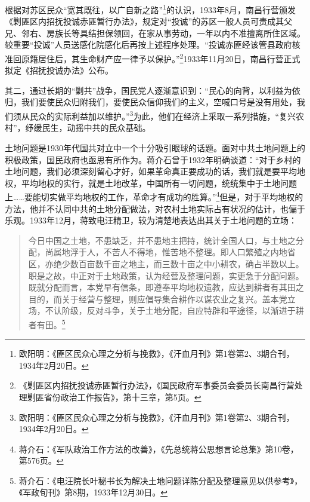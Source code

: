 根据对苏区民众“宽其既往，以广自新之路”\footnote{欧阳明：《匪区民众心理之分析与挽救》，《汗血月刊》第1卷第2、3期合刊，1934年2月20日。}的认识，1933年8月，南昌行营颁发《剿匪区内招抚投诚赤匪暂行办法》，规定对“投诚”的苏区一般人员可责成其父兄、邻右、房族长等具结担保领回，在家从事劳动，一年以内不准擅离所住区域。较重要“投诚”人员送感化院感化后再按上述程序处理。“投诚赤匪经该管县政府核准回原籍居住后，其生命财产应一律予以保护。”\footnote{《剿匪区内招抚投诚赤匪暂行办法》，《国民政府军事委员会委员长南昌行营处理剿匪省份政治工作报告》，第十三章，第5页。}1933年11月20日，南昌行营正式拟定《招抚投诚办法》公布。


其二，通过长期的“剿共”战争，国民党人逐渐意识到：“民心的向背，以利益为依归，我们要使民众归附我们，要使民众信仰我们的主义，空喊口号是没有用处，我们须从民众的实际利益加以维护。”\footnote{欧阳明：《匪区民众心理之分析与挽救》，《汗血月刊》第1卷第2、3期合刊，1934年2月20日。}为此，他们在经济上采取一系列措施，“复兴农村”，纾缓民生，动摇中共的民众基础。


土地问题是1930年代国共对立中一个十分吸引眼球的话题。面对中共土地问题上的积极政策，国民政府也亟思有所作为。蒋介石曾于1932年明确谈道：“对于乡村的土地问题，我们必须深刻留心才好，如果革命真正要成功的话，我们就是要平均地权，平均地权的实行，就是土地改革，中国所有一切问题，统统集中于土地问题上……要能切实做平均地权的工作，革命才有成功的胜算。”\footnote{蒋介石：《军队政治工作方法的改善》，《先总统蒋公思想言论总集》第10卷，第576页。}但是，对于平均地权的方法，他并不认同中共的土地分配做法，对农村土地实际占有状况的估计，也偏于乐观。1933年12月，蒋致电汪精卫，较为清楚地表达出其关于土地问题的立场：

\begin{quote}

今日中国之土地，不患缺乏，并不患地主把持，统计全国人口，与土地之分配，尚属地浮于人，不苦人不得地，惟苦地不整理。即人口繁殖之内地省区，亦绝少数百亩数千亩之地主，而三数十亩之中小耕农，确占半数以上。职是之故，中正对于土地政策，认为经营及整理问题，实更急于分配问题。既就分配而言，本党早有信条，即遵奉平均地权遗教，应达到耕者有其田之目的，而关于经营与整理，则应倡导集合耕作以谋农业之复兴。盖本党立场，不认阶级，反对斗争，关于土地分配，自应特辟和平途径，以渐进于耕者有田。\footnote{蒋介石：《电汪院长叶秘书长为解决土地问题详陈分配及整理意见以供参考》，《军政旬刊》第8期，1933年12月30日。}
\end{quote}


